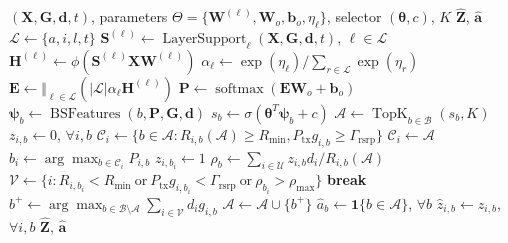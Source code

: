 \documentclass[journal]{IEEEtran}
\begin{document}
\begin{algorithm}[!t]
\caption{Multilayer GNN Association With Active-BS Repair}
\label{alg:method}
\begin{algorithmic}[1]
\Require $(\mathbf{X},\mathbf{G},\mathbf{d},t)$, parameters
$\Theta=\{\mathbf{W}^{(\ell)},\mathbf{W}_o,\mathbf{b}_o,\eta_{\ell}\}$,
selector $(\boldsymbol{\theta},c)$, $K$
\Ensure $\widehat{\mathbf{Z}}$, $\widehat{\mathbf{a}}$
\State $\mathcal{L}\gets\{a,i,l,t\}$
\State $\mathbf{S}^{(\ell)}\gets\operatorname{LayerSupport}_{\ell}
(\mathbf{X},\mathbf{G},\mathbf{d},t)$, $\ell\in\mathcal{L}$
    \State $\mathbf{H}^{(\ell)}
    \gets \phi(\mathbf{S}^{(\ell)}\mathbf{X}\mathbf{W}^{(\ell)})$
\EndFor
\State $\alpha_{\ell}\gets
\exp(\eta_{\ell})/\sum_{r\in\mathcal{L}}\exp(\eta_r)$
\State $\mathbf{E}\gets
\Vert_{\ell\in\mathcal{L}}\left(|\mathcal{L}|\alpha_{\ell}
\mathbf{H}^{(\ell)}\right)$
\State $\mathbf{P}\gets\operatorname{softmax}(\mathbf{E}\mathbf{W}_o+\mathbf{b}_o)$
    \State $\boldsymbol{\psi}_b\gets\operatorname{BSFeatures}(b,\mathbf{P},
    \mathbf{G},\mathbf{d})$
    \State $s_b\gets\sigma(\boldsymbol{\theta}^{T}\boldsymbol{\psi}_b+c)$
\EndFor
\State $\mathcal{A}\gets\operatorname{TopK}_{b\in\mathcal{B}}(s_b,K)$
\Repeat
    \State $z_{i,b}\gets0$, $\forall i,b$
        \State $\mathcal{C}_i\gets
        \{b\in\mathcal{A}:R_{i,b}(\mathcal{A})\geq R_{\min},
        P_{\mathrm{tx}}g_{i,b}\geq\Gamma_{\mathrm{rsrp}}\}$
            \State $\mathcal{C}_i\gets\mathcal{A}$
        \EndIf
        \State $b_i\gets\arg\max_{b\in\mathcal{C}_i}P_{i,b}$
        \State $z_{i,b_i}\gets1$
    \EndFor
    \State $\rho_b\gets\sum_{i\in\mathcal{U}}z_{i,b}d_i/R_{i,b}(\mathcal{A})$
    \State $\mathcal{V}\gets\{i:R_{i,b_i}<R_{\min}\ \text{or}\
    P_{\mathrm{tx}}g_{i,b_i}<\Gamma_{\mathrm{rsrp}}\ \text{or}\
    \rho_{b_i}>\rho_{\max}\}$
    \If{$\mathcal{V}=\varnothing$ or $|\mathcal{A}|=B$}
        \State \textbf{break}
    \EndIf
    \State $b^{+}\gets
    \arg\max_{b\in\mathcal{B}\setminus\mathcal{A}}
    \sum_{i\in\mathcal{V}}d_i g_{i,b}$
    \State $\mathcal{A}\gets\mathcal{A}\cup\{b^{+}\}$
\State $\widehat{a}_b\gets\mathbf{1}\{b\in\mathcal{A}\}$, $\forall b$
\State $\widehat{z}_{i,b}\gets z_{i,b}$, $\forall i,b$
\State \Return $\widehat{\mathbf{Z}}$, $\widehat{\mathbf{a}}$
\end{algorithmic}
\end{algorithm}
\end{document}
